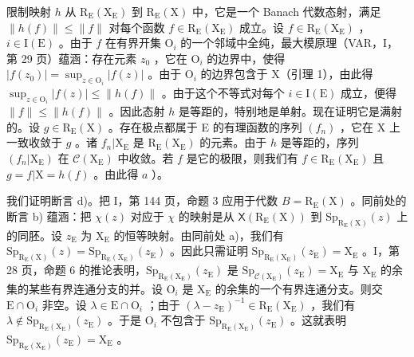 限制映射 \(h\) 从 \(\mathrm{R}_{\mathrm{E}}(\mathrm{X}_{\mathrm{E}})\) 到 \(\mathrm{R}_{\mathrm{E}}(\mathrm{X})\) 中，它是一个 Banach 代数态射，满足 \(\| h(f)\| \leqslant \| f\|\) 对每个函数 \(f\in \mathrm{R}_{\mathrm{E}}(\mathrm{X}_{\mathrm{E}})\) 成立。设 \(f\in \mathrm{R}_{\mathrm{E}}(\mathrm{X}_{\mathrm{E}})\) ，\(i\in \mathrm{I}(\mathrm{E})\) 。由于 \(f\) 在有界开集 \(\mathrm{O}_i\) 的一个邻域中全纯，最大模原理（VAR，I，第 29 页）蕴涵：存在元素 \(z_0\) ，它在 \(\mathrm{O}_i\) 的边界中，使得 \(|f(z_0)| = \sup_{z\in \mathrm{O}_i}|f(z)|\) 。由于 \(\mathrm{O}_i\) 的边界包含于 X（引理 1），由此得 \(\sup_{z\in \mathrm{O}_i}|f(z)|\leqslant \| h(f)\|\) 。由于这个不等式对每个 \(i\in \mathrm{I}(\mathrm{E})\) 成立，便得 \(\| f\| \leqslant \| h(f)\|\) 。因此态射 \(h\) 是等距的，特别地是单射。现在证明它是满射的。设 \(g\in \mathrm{R}_{\mathrm{E}}(\mathrm{X})\) 。存在极点都属于 E 的有理函数的序列 \((f_n)\) ，它在 X 上一致收敛于 \(g\) 。诸 \(f_n|\mathrm{X}_{\mathrm{E}}\) 是 \(\mathrm{R}_{\mathrm{E}}(\mathrm{X}_{\mathrm{E}})\) 的元素。由于 \(h\) 是等距的，序列 \((f_n|\mathrm{X}_{\mathrm{E}})\) 在 \(\mathcal{C}(\mathrm{X}_{\mathrm{E}})\) 中收敛。若 \(f\) 是它的极限，则我们有 \(f\in \mathrm{R}_{\mathrm{E}}(\mathrm{X}_{\mathrm{E}})\) 且 \(g = f|\mathrm{X} = h(f)\) 。由此得 \(a\) ）。

我们证明断言 d)。把 I，第 144 页，命题 3 应用于代数 \(B = \mathrm{R}_{\mathrm{E}}(\mathrm{X})\) 。同前处的断言 b) 蕴涵：把 \(\chi(z)\) 对应于 \(\chi\) 的映射是从 \(\mathsf{X}(\mathrm{R}_{\mathrm{E}}(\mathrm{X}))\) 到 \(\mathrm{Sp}_{\mathrm{R}_{\mathrm{E}}(\mathrm{X})}(z)\) 上的同胚。设 \(z_{\mathrm{E}}\) 为 \(\mathrm{X}_{\mathrm{E}}\) 的恒等映射。由同前处 a)，我们有 \(\mathrm{Sp}_{\mathrm{R}_{\mathrm{E}}(\mathrm{X})}(z) = \mathrm{Sp}_{\mathrm{R}_{\mathrm{E}}(\mathrm{X}_{\mathrm{E}})}(z_{\mathrm{E}})\) 。因此只需证明 \(\mathrm{Sp}_{\mathrm{R}_{\mathrm{E}}(\mathrm{X}_{\mathrm{E}})}(z_{\mathrm{E}}) = \mathrm{X}_{\mathrm{E}}\) 。I，第 28 页，命题 6 的推论表明，\(\mathrm{Sp}_{\mathrm{R}_{\mathrm{E}}(\mathrm{X}_{\mathrm{E}})}(z_{\mathrm{E}})\) 是 \(\mathrm{Sp}_{\mathcal{C}(\mathrm{X}_{\mathrm{E}})}(z_{\mathrm{E}}) = \mathrm{X}_{\mathrm{E}}\) 与 \(\mathrm{X}_{\mathrm{E}}\) 的余集的某些有界连通分支的并。设 \(\mathrm{O}_{i}\) 是 \(\mathrm{X}_{\mathrm{E}}\) 的余集的一个有界连通分支。则交 \(\mathrm{E} \cap \mathrm{O}_{i}\) 非空。设 \(\lambda \in \mathrm{E} \cap \mathrm{O}_{i}\) ；由于 \((\lambda - z_{\mathrm{E}})^{-1} \in \mathrm{R}_{\mathrm{E}}(\mathrm{X}_{\mathrm{E}})\) ，我们有 \(\lambda \notin \mathrm{Sp}_{\mathrm{R}_{\mathrm{E}}(\mathrm{X}_{\mathrm{E}})}(z_{\mathrm{E}})\) 。于是 \(\mathrm{O}_{i}\) 不包含于 \(\mathrm{Sp}_{\mathrm{R}_{\mathrm{E}}(\mathrm{X}_{\mathrm{E}})}(z_{\mathrm{E}})\) 。这就表明 \(\mathrm{Sp}_{\mathrm{R}_{\mathrm{E}}(\mathrm{X}_{\mathrm{E}})}(z_{\mathrm{E}}) = \mathrm{X}_{\mathrm{E}}\) 。

